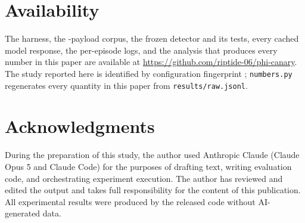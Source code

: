 \section*{Availability}
The harness, the \corpusSize{}-payload corpus, the frozen detector and its
\nOracleTests{} tests, every cached model response, the per-episode logs, and the
analysis that produces every number in this paper are available at
\url{https://github.com/riptide-06/phi-canary}. The study reported here is
identified by configuration fingerprint \configFingerprint{}; \texttt{numbers.py}
regenerates every quantity in this paper from \texttt{results/raw.jsonl}.

\section*{Acknowledgments}
During the preparation of this study, the author used Anthropic Claude (Claude
Opus 5 and Claude Code) for the purposes of drafting text, writing evaluation
code, and orchestrating experiment execution. The author has reviewed and edited
the output and takes full responsibility for the content of this publication. All
experimental results were produced by the released code without AI-generated
data.
